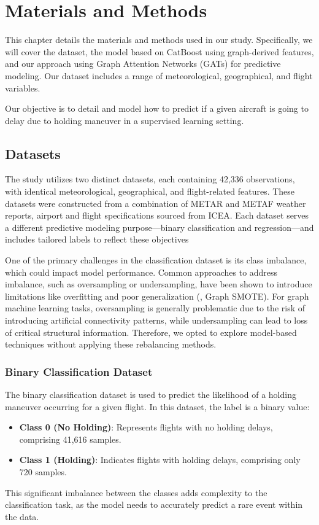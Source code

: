 \chapter[Materials and Methods]{Materials and Methods}
\label{Materials}

This chapter details the materials and methods used in our study. Specifically, we will cover the dataset, the model based on CatBoost using graph-derived features, and our approach using Graph Attention Networks (GATs) for predictive modeling. Our dataset includes a range of meteorological, geographical, and flight variables. 

Our objective is to detail and model how to predict if a given aircraft is going to delay due to holding maneuver in a supervised learning setting.

\section{Datasets}
\label{Datasets}

The study utilizes two distinct datasets, each containing 42,336 observations, with identical meteorological, geographical, and flight-related features. These datasets were constructed from a combination of METAR and METAF weather reports, airport and flight specifications sourced from ICEA. Each dataset serves a different predictive modeling purpose—binary classification and regression—and includes tailored labels to reflect these objectives

One of the primary challenges in the classification dataset is its class imbalance, which could impact model performance. Common approaches to address imbalance, such as oversampling or undersampling, have been shown to introduce limitations like overfitting and poor generalization (\cite{zhao2021graphsmote}, Graph SMOTE). For graph machine learning tasks, oversampling is generally problematic due to the risk of introducing artificial connectivity patterns, while undersampling can lead to loss of critical structural information. Therefore, we opted to explore model-based techniques without applying these rebalancing methods.

\subsection{Binary Classification Dataset}
The binary classification dataset is used to predict the likelihood of a holding maneuver occurring for a given flight. In this dataset, the label is a binary value:
\begin{itemize}
    \item \textbf{Class 0 (No Holding)}: Represents flights with no holding delays, comprising 41,616 samples.
    \item \textbf{Class 1 (Holding)}: Indicates flights with holding delays, comprising only 720 samples.
\end{itemize}
This significant imbalance between the classes adds complexity to the classification task, as the model needs to accurately predict a rare event within the data.

